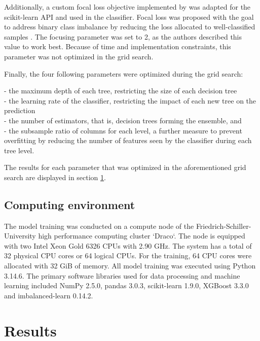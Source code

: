 \documentclass[hidelinks,11pt]{article}
\begin{document}
Additionally, a custom focal loss objective implemented by \cite{wangImbalanceXGBoostLeveragingWeighted2020}
was adapted for the scikit-learn API and used in the classifier.
Focal loss was proposed with the goal to address binary class imbalance by
reducing the loss allocated to well-classified samples \parencite{linFocalLossDense2017}.
The focusing parameter was set to 2, as the authors described this value to work best.
Because of time and implementation constraints, this parameter was not optimized in the grid search.

Finally, the four following parameters were optimized during the grid search: 

- the maximum depth of each tree, restricting the size of each decision tree\\
- the learning rate of the classifier, restricting the impact of each new tree on the prediction\\
- the number of estimators, that is, decision trees forming the ensemble, and \\
- the subsample ratio of columns for each level, a further measure to prevent overfitting by reducing the number of 
features seen by the classifier during each tree level.

The results for each parameter that was optimized in the aforementioned grid search are displayed in 
section \ref{sec:results}.
\subsection{Computing environment} \label{sec:env}

The model training was conducted on a compute node of the Friedrich-Schiller-University 
high performance computing cluster `Draco`.
The node is equipped with two Intel Xeon Gold 6326 CPUs with 2.90 GHz.
The system has a total of 32 physical CPU cores or 64 logical CPUs.
For the training, 64 CPU cores were allocated with 32 GiB of memory.
All model training was executed using Python 3.14.6. 
The primary software libraries used for data processing and machine learning included 
NumPy 2.5.0, pandas 3.0.3, scikit-learn 1.9.0, XGBoost 3.3.0 and imbalanced-learn 0.14.2.

\newpage
\section{Results} \label{sec:results}
\end{document}
